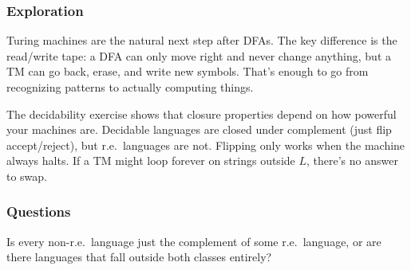 \documentclass{article}
\theoremstyle{theorem}
\theoremstyle{definition}
\theoremstyle{remark}
\begin{document}
\subsubsection{Exploration}

Turing machines are the natural next step after DFAs. The key difference is the read/write tape: a DFA can only move right and never change anything, but a TM can go back, erase, and write new symbols. That's enough to go from recognizing patterns to actually computing things.

The decidability exercise shows that closure properties depend on how powerful your machines are. Decidable languages are closed under complement (just flip accept/reject), but r.e.\ languages are not. Flipping only works when the machine always halts. If a TM might loop forever on strings outside $L$, there's no answer to swap.

\subsubsection{Questions}

Is every non-r.e.\ language just the complement of some r.e.\ language, or are there languages that fall outside both classes entirely?
\end{document}
